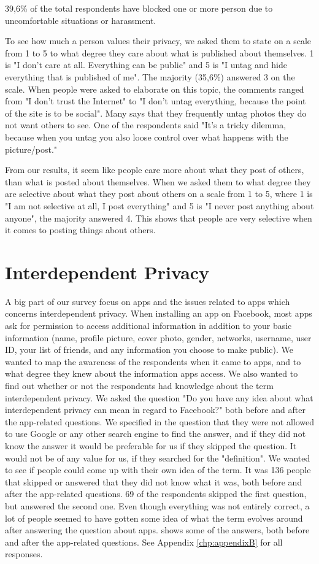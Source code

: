 39,6\% of the total respondents have blocked one or more person due to uncomfortable situations or harassment. 

To see how much a person values their privacy, we asked them to state on a scale from 1 to 5 to what degree they care about what is published about themselves. 1 is "I don't care at all. Everything can be public" and 5 is "I untag and hide everything that is published of me". The majority (35,6\%) answered 3 on the scale.  When people were asked to elaborate on this topic, the comments ranged from "I don't trust the Internet" to "I don't untag everything, because the point of the site is to be social". Many says that they frequently untag photos they do not want others to see. One of the respondents said "It's a tricky dilemma, because when you untag you also loose control over what happens with the picture/post."

From our results, it seem like people care more about what they post of others, than what is posted about themselves. When we asked them to what degree they are selective about what they post about others on a scale from 1 to 5, where 1 is "I am not selective at all, I post everything" and 5 is "I never post anything about anyone", the majority answered 4. This shows that people are very selective when it comes to posting things about others.

\section{Interdependent Privacy}

A big part of our survey focus on apps and the issues related to apps which concerns interdependent privacy. When installing an app on Facebook, most apps ask for permission to access additional information in addition to your basic information (name, profile picture, cover photo, gender, networks, username, user ID, your list of friends, and any information you choose to make public). We wanted to map the awareness of the respondents when it came to apps, and to what degree they knew about the information apps access. We also wanted to find out whether or not the respondents had knowledge about the term interdependent privacy. We asked the question "Do you have any idea about what interdependent privacy can mean in regard to Facebook?" both before and after the app-related questions. We specified in the question that they were not allowed to use Google or any other search engine to find the answer, and if they did not know the answer it would be preferable for us if they skipped the question. It would not be of any value for us, if they searched for the "definition". We wanted to see if people could come up with their own idea of the term. It was 136 people that skipped or answered that they did not know what it was, both before and after the app-related questions. 69 of the respondents skipped the first question, but answered the second one. Even though everything was not entirely correct, a lot of people seemed to have gotten some idea of what the term evolves around after answering the question about apps.  shows some of the answers, both before and after the app-related questions. See Appendix \ref{chp:appendixB} for all responses.   

